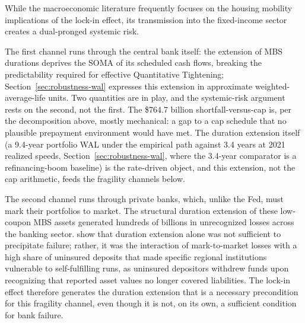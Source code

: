 \documentclass[12pt]{article}
\begin{document}
While the macroeconomic literature frequently focuses on the housing mobility implications of the lock-in effect, its transmission into the fixed-income sector creates a dual-pronged systemic risk.

The first channel runs through the central bank itself: the extension of MBS durations deprives the SOMA of its scheduled cash flows, breaking the predictability required for effective Quantitative Tightening; Section~\ref{sec:robustness-wal} expresses this extension in approximate weighted-average-life units. Two quantities are in play, and the systemic-risk argument rests on the second, not the first. The \$764.7 billion shortfall-versus-cap is, per the decomposition above, mostly mechanical: a gap to a cap schedule that no plausible prepayment environment would have met. The duration extension itself (a 9.4-year portfolio WAL under the empirical path against 3.4 years at 2021 realized speeds, Section~\ref{sec:robustness-wal}, where the 3.4-year comparator is a refinancing-boom baseline) is the rate-driven object, and this extension, not the cap arithmetic, feeds the fragility channels below.

The second channel runs through private banks, which, unlike the Fed, must mark their portfolios to market. The structural duration extension of these low-coupon MBS assets generated hundreds of billions in unrecognized losses across the banking sector. \citet{jiang2023} show that duration extension alone was not sufficient to precipitate failure; rather, it was the interaction of mark-to-market losses with a high share of uninsured deposits that made specific regional institutions vulnerable to self-fulfilling runs, as uninsured depositors withdrew funds upon recognizing that reported asset values no longer covered liabilities. The lock-in effect therefore generates the duration extension that is a necessary precondition for this fragility channel, even though it is not, on its own, a sufficient condition for bank failure.
\end{document}
